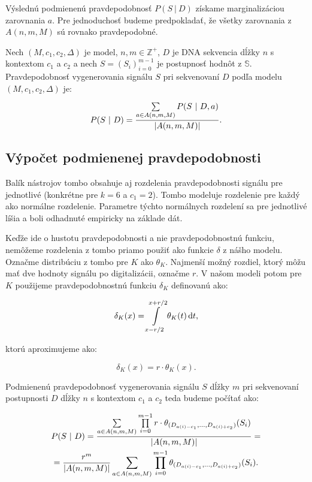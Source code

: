 Výslednú podmienenú pravdepodobnosť $P(S ~|~ D)$ získame marginalizáciou zarovnania $a$.
 Pre jednoduchosť budeme predpokladať, že všetky zarovnania z $A(n, m, M)$ sú rovnako pravdepodobné.

\begin{definicia}

Nech $(M, c_1, c_2, \Delta)$ je  model, $n, m \in \mathbb{Z}^+$, $D$ je DNA sekvencia dĺžky $n$ s kontextom $c_1$ a $c_2$ a nech $S = (S_i)_{i=0}^{m-1}$ je postupnosť hodnôt z $\mathbb{S}$.
Pravdepodobnosť vygenerovania signálu $S$ pri sekvenovaní $D$ podľa modelu $(M, c_1, c_2, \Delta)$ je:

$$P(S ~|~ D) =  \frac{\sum\limits_{a \in A(n, m, M)} P(S ~|~ D, a)}{\abs*{A(n, m, M)}} \text{.}$$
\end{definicia}



\subsection{Výpočet podmienenej pravdepodobnosti}
\label{sec:dtw}

Balík nástrojov tombo obsahuje aj rozdelenia pravdepodobnosti signálu pre jednotlivé  (konkrétne pre $k=6$ a
$c_1 = 2$). Tombo modeluje rozdelenie pre každý \kmer{} ako normálne rozdelenie. Parametre týchto normálnych rozdelení
sa pre jednotlivé  líšia a boli odhadnuté empiricky na základe dát. 

Keďže ide o hustotu pravdepodobnosti a nie pravdepodobnostnú funkciu, nemôžeme rozdelenia z tombo priamo použiť
ako funkcie $\delta$ z nášho modelu. Označme distribúciu z tombo pre \kmer{} $K$ ako $\theta_K$. Najmenší možný rozdiel,
ktorý môžu mať dve hodnoty signálu po digitalizácii, označme $r$. V našom modeli potom pre \kmer{} $K$ použijeme
pravdepodobnostnú funkciu $\delta_K$ definovanú ako:

$$\delta_K(x) = \int\limits_{x-r/2}^{x+r/2} \theta_K(t) \diff t \text{,}$$

ktorú aproximujeme ako:

$$\delta_K(x) = r \cdot \theta_K(x) \text{.}$$

Podmienenú pravdepodobnosť vygenerovania signálu $S$ dĺžky $m$ pri sekvenovaní postupnosti $D$ dĺžky $n$ s kontextom 
$c_1$ a $c_2$ teda budeme počítať ako:

\begin{multline*}
P(S ~|~ D) = \frac{\sum\limits_{a \in A(n, m, M)} \prod\limits_{i=0}^{m-1} r \cdot \theta_{(D_{a(i)-c_1}, \dots, D_{a(i)+c_2})}(S_i)}{\abs*{A(n, m, M)}} = \\
= \frac{r^m}{\abs*{A(n, m, M)}} \sum\limits_{a \in A(n, m, M)} \prod\limits_{i=0}^{m-1} \theta_{(D_{a(i)-c_1}, \dots, D_{a(i)+c_2})}(S_i) \text{.} 
\end{multline*}

